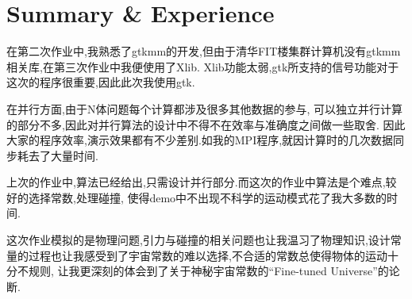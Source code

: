 \section{Summary \& Experience}
	在第二次作业中,我熟悉了gtkmm的开发,但由于清华FIT楼集群计算机没有gtkmm相关库,在第三次作业中我便使用了Xlib.
	Xlib功能太弱,gtk所支持的信号功能对于这次的程序很重要,因此此次我使用gtk.
	
	在并行方面,由于N体问题每个计算都涉及很多其他数据的参与,
	可以独立并行计算的部分不多,因此对并行算法的设计中不得不在效率与准确度之间做一些取舍.
	因此大家的程序效率,演示效果都有不少差别.如我的MPI程序,就因计算时的几次数据同步耗去了大量时间.

	上次的作业中,算法已经给出,只需设计并行部分.而这次的作业中算法是个难点,较好的选择常数,处理碰撞,
	使得demo中不出现不科学的运动模式花了我大多数的时间.

	这次作业模拟的是物理问题,引力与碰撞的相关问题也让我温习了物理知识,设计常量的过程也让我感受到了宇宙常数的难以选择,不合适的常数总使得物体的运动十分不规则,
	让我更深刻的体会到了关于神秘宇宙常数的``Fine-tuned Universe''的论断\cite{tune}.
